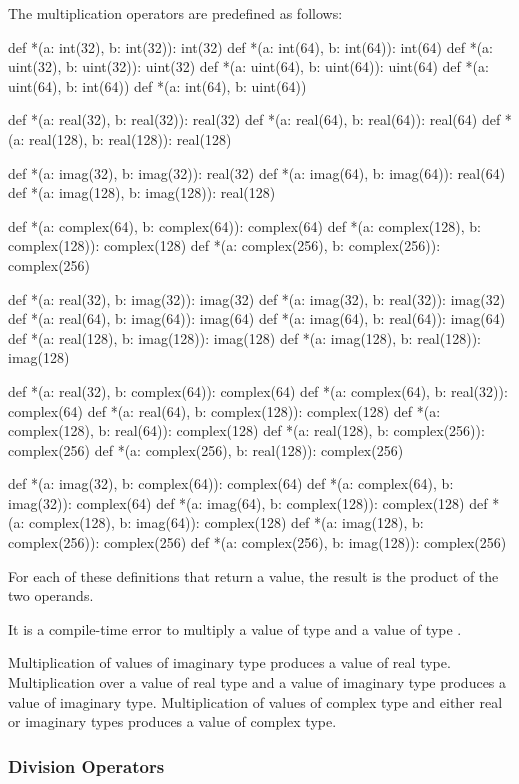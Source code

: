 The multiplication operators are predefined as follows:
\begin{chapel}
def *(a: int(32), b: int(32)): int(32)
def *(a: int(64), b: int(64)): int(64)
def *(a: uint(32), b: uint(32)): uint(32)
def *(a: uint(64), b: uint(64)): uint(64)
def *(a: uint(64), b: int(64))
def *(a: int(64), b: uint(64))

def *(a: real(32), b: real(32)): real(32)
def *(a: real(64), b: real(64)): real(64)
def *(a: real(128), b: real(128)): real(128)

def *(a: imag(32), b: imag(32)): real(32)
def *(a: imag(64), b: imag(64)): real(64)
def *(a: imag(128), b: imag(128)): real(128)

def *(a: complex(64), b: complex(64)): complex(64)
def *(a: complex(128), b: complex(128)): complex(128)
def *(a: complex(256), b: complex(256)): complex(256)

def *(a: real(32), b: imag(32)): imag(32)
def *(a: imag(32), b: real(32)): imag(32)
def *(a: real(64), b: imag(64)): imag(64)
def *(a: imag(64), b: real(64)): imag(64)
def *(a: real(128), b: imag(128)): imag(128)
def *(a: imag(128), b: real(128)): imag(128)

def *(a: real(32), b: complex(64)): complex(64)
def *(a: complex(64), b: real(32)): complex(64)
def *(a: real(64), b: complex(128)): complex(128)
def *(a: complex(128), b: real(64)): complex(128)
def *(a: real(128), b: complex(256)): complex(256)
def *(a: complex(256), b: real(128)): complex(256)

def *(a: imag(32), b: complex(64)): complex(64)
def *(a: complex(64), b: imag(32)): complex(64)
def *(a: imag(64), b: complex(128)): complex(128)
def *(a: complex(128), b: imag(64)): complex(128)
def *(a: imag(128), b: complex(256)): complex(256)
def *(a: complex(256), b: imag(128)): complex(256)
\end{chapel}
For each of these definitions that return a value, the result is the
product of the two operands.

It is a compile-time error to multiply a value of type  and
a value of type .

Multiplication of values of imaginary type produces a value of real
type.  Multiplication over a value of real type and a value of
imaginary type produces a value of imaginary type.  Multiplication of
values of complex type and either real or imaginary types produces a
value of complex type.

\subsubsection{Division Operators}
\label{Division_Operators}

